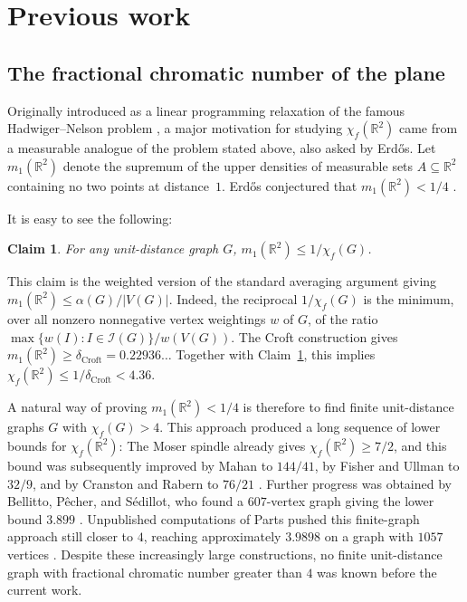 \documentclass[pdflatex,sn-mathphys-num]{sn-jnl}%
\newtheorem{claim}{Claim}
\begin{document}
\section{Previous work}

\subsection{The fractional chromatic number of the plane}

Originally introduced as a linear programming relaxation of the famous Hadwiger--Nelson problem \cite{Gardner60,Soifer}, a major motivation for studying $\chi_f(\mathbb R^2)$ came from a measurable analogue of the problem stated above, also asked by Erdős. Let $m_1(\mathbb R^2)$ denote the supremum of the upper densities of measurable sets $A\subseteq\mathbb R^2$ containing no two points at distance~$1$. Erdős conjectured that $m_1(\mathbb R^2) < 1/4$ \cite{Er85}.

It is easy to see the following:

\begin{claim}\label{m1_vs_chi_f}
For any unit-distance graph $G$, $m_1(\mathbb R^2) \le 1 / \chi_f(G)$. 
\end{claim}

This claim is the weighted version of the standard averaging argument giving $m_1(\mathbb R^2)\le \alpha(G)/|V(G)|$. Indeed, the reciprocal $1/\chi_f(G)$ is the minimum, over all nonzero nonnegative vertex weightings $w$ of $G$, of the ratio $\max\{w(I): I\in\mathcal I(G)\}/w(V(G))$. The Croft construction \cite{Croft} gives $m_1(\mathbb R^2) \ge \delta_{\text{Croft}} = 0.22936\dots$ Together with Claim~\ref{m1_vs_chi_f}, this implies $\chi_f(\mathbb R^2) \leq 1/\delta_{\text{Croft}} < 4.36$.

A natural way of proving $m_1(\mathbb R^2)<1/4$ is therefore to find finite unit-distance graphs $G$ with $\chi_f(G)>4$. This approach produced a long sequence of lower bounds for $\chi_f(\mathbb R^2)$: The Moser spindle already gives $\chi_f(\mathbb R^2)\ge 7/2$, and this bound was subsequently improved by Mahan to $144/41$, by Fisher and Ullman to $32/9$, and by Cranston and Rabern to $76/21$ \cite{Mahan,FisherUllman,CranstonRabern}. Further progress was obtained by Bellitto, Pêcher, and Sédillot, who found a $607$-vertex graph giving the lower bound $3.899$ \cite{BellittoPecherSedillot}. Unpublished computations of Parts pushed this finite-graph approach still closer to $4$, reaching approximately $3.9898$ on a graph with $1057$ vertices \cite{Parts}. Despite these increasingly large constructions, no finite unit-distance graph with fractional chromatic number greater than $4$ was known before the current work.
\end{document}
